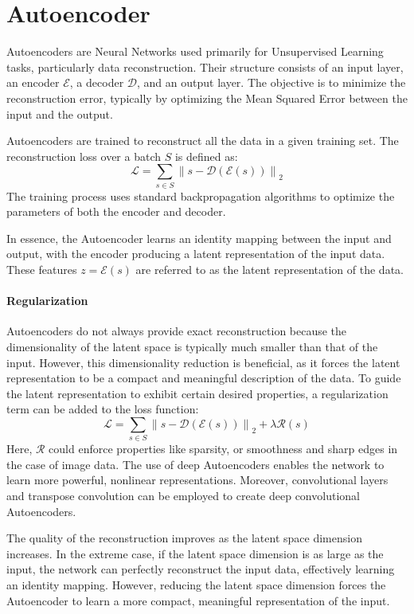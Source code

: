 \section{Autoencoder}

Autoencoders are Neural Networks used primarily for Unsupervised Learning tasks, particularly data reconstruction. 
Their structure consists of an input layer, an encoder $\mathcal{E}$, a decoder $\mathcal{D}$, and an output layer. 
The objective is to minimize the reconstruction error, typically by optimizing the Mean Squared Error between the input and the output. 

Autoencoders are trained to reconstruct all the data in a given training set. 
The reconstruction loss over a batch $S$ is defined as:
\[\mathcal{L}=\sum_{s\in S}{\left\lVert s-\mathcal{D}(\mathcal{E}(s))\right\rVert}_2 \]
The training process uses standard backpropagation algorithms to optimize the parameters of both the encoder and decoder.

In essence, the Autoencoder learns an identity mapping between the input and output, with the encoder producing a latent representation of the input data.
These features $z=\mathcal{E}(s)$ are referred to as the latent representation of the data.

\paragraph*{Regularization}
Autoencoders do not always provide exact reconstruction because the dimensionality of the latent space is typically much smaller than that of the input. 
However, this dimensionality reduction is beneficial, as it forces the latent representation to be a compact and meaningful description of the data.
To guide the latent representation to exhibit certain desired properties, a regularization term can be added to the loss function:
\[\mathcal{L}=\sum_{s\in S}{\left\lVert s-\mathcal{D}(\mathcal{E}(s))\right\rVert}_2+\lambda\mathcal{R}(s) \]
Here, $\mathcal{R}$ could enforce properties like sparsity, or smoothness and sharp edges in the case of image data.
The use of deep Autoencoders enables the network to learn more powerful, nonlinear representations. 
Moreover, convolutional layers and transpose convolution can be employed to create deep convolutional Autoencoders.

The quality of the reconstruction improves as the latent space dimension increases. 
In the extreme case, if the latent space dimension is as large as the input, the network can perfectly reconstruct the input data, effectively learning an identity mapping.
However, reducing the latent space dimension forces the Autoencoder to learn a more compact, meaningful representation of the input.

